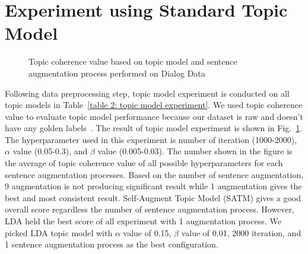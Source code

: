 \documentclass[senior]{IPSstyle}
\begin{document}
\section{Experiment using Standard Topic Model}
\begin{figure}[h]
	\centering
	\caption{Topic coherence value based on topic model and sentence augmentation process performed on Dialog Data}
\label{fig_tme}
\end{figure}

Following data preprocessing step, topic model experiment is conducted on all topic models in Table~\ref{table 2: topic model experiment}. We used topic coherence value to evaluate topic model performance because our dataset is raw and doesn’t have any golden labels~\cite{qiang}. The result of topic model experiment is shown in Fig.~\ref{fig_tme}. The hyperparameter used in this experiment is number of iteration (1000-2000), $\alpha$ value (0.05-0.3), and $\beta$ value (0.005-0.03). The number shown in the figure is the average of topic coherence value of all possible hyperparameters for each sentence augmentation processes. Based on the number of sentence augmentation, 9 augmentation is not producing significant result while 1 augmentation gives the best and most consistent result. Self-Augment Topic Model (SATM) gives a good overall score regardless the number of sentence augmentation process. However, LDA held the best score of all experiment with 1 augmentation process. We picked LDA topic model with $\alpha$ value of 0.15, $\beta$ value of 0.01, 2000 iteration, and 1 sentence augmentation process as the best configuration.
\end{document}
